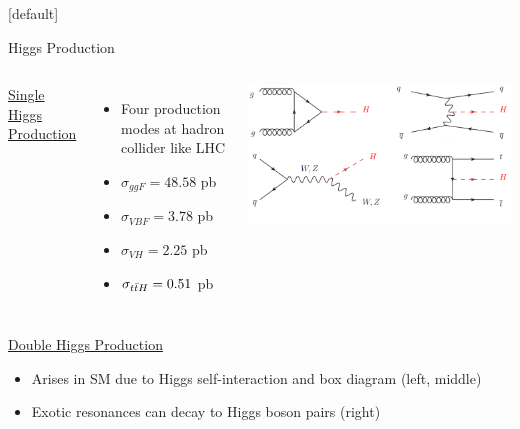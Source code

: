 \documentclass{beamer}
\newcommand*{\ttbar}{\ensuremath{\lowercase{t\bar{t}}}\xspace}
\begin{document}
{  \makeatletter %
  [default]
  \def\beamer@entrycode{\vspace*{-1.075\headheight}}
  \begin{frame} {Higgs Production}
    \vspace{-8pt}
    \begin{columns}
      \begin{center}\underline{Single Higgs Production}\end{center}\vspace{-10pt}
      \begin{itemize}\footnotesize
      \item Four production modes at hadron collider like LHC
        \item $\sigma_{ggF} = 48.58$ pb
        \item $\sigma_{VBF} = 3.78$ pb
        \item $\sigma_{VH} = 2.25$ pb
        \item $\sigma_{\ttbar H} = 0.51$ pb
      \end{itemize}
      \vspace{25pt}
      \includegraphics[width=\textwidth]{figures/higgs_prod_mech_pdg}
    \end{columns}
    \vspace{-10pt}
    \begin{center}\underline{Double Higgs Production}\end{center}\vspace{-10pt}
    \begin{itemize}\small
    \item Arises in SM due to Higgs self-interaction and box diagram (left, middle)
    \item Exotic resonances can decay to Higgs boson pairs (right)

\end{itemize}
\end{frame}}
\end{document}
